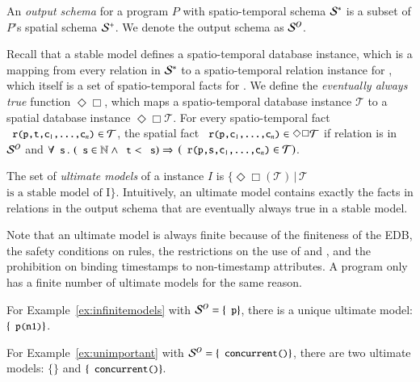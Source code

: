 
An {\em output schema} for a \lang program $P$ with spatio-temporal schema
$\stschema$ is a subset of $P$'s spatial schema $\sschema$.  We denote the output schema as
$\oschema$.

Recall that a stable model defines a spatio-temporal database instance, which is a mapping from every relation  in $\stschema$ to a spatio-temporal relation instance for , which itself is a set of spatio-temporal facts for .  We define the {\em eventually always true} function $\Diamond\Box$, which maps a spatio-temporal database instance $\mathcal{T}$ to a spatial database instance $\Diamond\Box\mathcal{T}$.  For every spatio-temporal fact $\dedalus{r(p,t,c\sub{1},\ldots,c\sub{n})} \in \mathcal{T}$, the spatial fact $\dedalus{r(p,c\sub{1},\ldots,c\sub{n})} \in \Diamond\Box\mathcal{T}$ if relation  is in $\oschema$ and $\forall \dedalus{s}\, . \, \left(\dedalus{s} \in \mathbb{N} \land \dedalus{t} < \dedalus{s}\right) \Rightarrow$ \linebreak $\left(\dedalus{r(p,s,c\sub{1},\ldots,c\sub{n})} \in \mathcal{T}\right)$.

The set of {\em ultimate models} of a \lang instance $I$ is
$\{\Diamond\Box(\mathcal{T}) \, | \, \mathcal{T}$ $\text{is a stable model of
  I}\}$.  Intuitively, an ultimate model contains exactly the facts in relations
in the output schema that are eventually always true in a stable model.

Note that an ultimate model is always finite because of the finiteness of the EDB, the safety conditions on rules, the restrictions on the use of  and , and the prohibition on binding timestamps to non-timestamp attributes.  A \lang program only has a finite number of ultimate models for the same reason.

\begin{example}
For Example~\ref{ex:infinitemodels} with $\oschema = \{\dedalus{p}\}$, there is a unique ultimate model:
$\{\dedalus{p(n1)}\}$.

For Example~\ref{ex:unimportant} with $\oschema = \{\dedalus{concurrent()}\}$, there are two ultimate models: $\{\}$ and $\{\dedalus{concurrent()}\}$.
\end{example}

